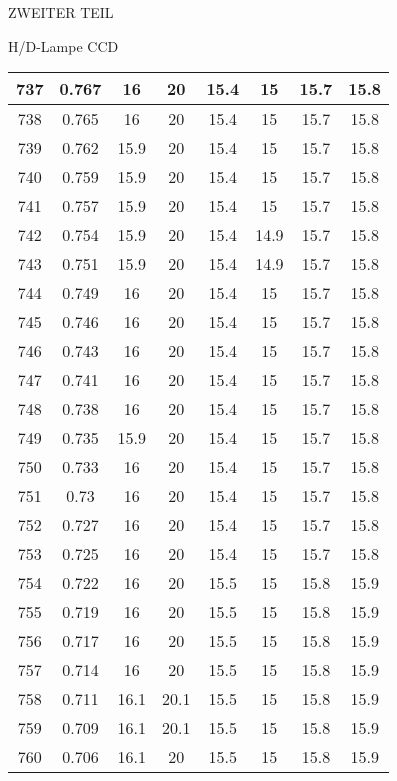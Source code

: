 \begin{appendix}
\begin{chapter}{ZWEITER TEIL}
\begin{section}{H/D-Lampe CCD}
\begin{scriptsize}
\begin{longtable}[htbp]{|c|c|c|c|c|c|c|c|}
            737 & 0.767 & 16 & 20 & 15.4 & 15 & 15.7 & 15.8 \\ \hline
            738 & 0.765 & 16 & 20 & 15.4 & 15 & 15.7 & 15.8 \\ \hline
            739 & 0.762 & 15.9 & 20 & 15.4 & 15 & 15.7 & 15.8 \\ \hline
            740 & 0.759 & 15.9 & 20 & 15.4 & 15 & 15.7 & 15.8 \\ \hline
            741 & 0.757 & 15.9 & 20 & 15.4 & 15 & 15.7 & 15.8 \\ \hline
            742 & 0.754 & 15.9 & 20 & 15.4 & 14.9 & 15.7 & 15.8 \\ \hline
            743 & 0.751 & 15.9 & 20 & 15.4 & 14.9 & 15.7 & 15.8 \\ \hline
            744 & 0.749 & 16 & 20 & 15.4 & 15 & 15.7 & 15.8 \\ \hline
            745 & 0.746 & 16 & 20 & 15.4 & 15 & 15.7 & 15.8 \\ \hline
            746 & 0.743 & 16 & 20 & 15.4 & 15 & 15.7 & 15.8 \\ \hline
            747 & 0.741 & 16 & 20 & 15.4 & 15 & 15.7 & 15.8 \\ \hline
            748 & 0.738 & 16 & 20 & 15.4 & 15 & 15.7 & 15.8 \\ \hline
            749 & 0.735 & 15.9 & 20 & 15.4 & 15 & 15.7 & 15.8 \\ \hline
            750 & 0.733 & 16 & 20 & 15.4 & 15 & 15.7 & 15.8 \\ \hline
            751 & 0.73 & 16 & 20 & 15.4 & 15 & 15.7 & 15.8 \\ \hline
            752 & 0.727 & 16 & 20 & 15.4 & 15 & 15.7 & 15.8 \\ \hline
            753 & 0.725 & 16 & 20 & 15.4 & 15 & 15.7 & 15.8 \\ \hline
            754 & 0.722 & 16 & 20 & 15.5 & 15 & 15.8 & 15.9 \\ \hline
            755 & 0.719 & 16 & 20 & 15.5 & 15 & 15.8 & 15.9 \\ \hline
            756 & 0.717 & 16 & 20 & 15.5 & 15 & 15.8 & 15.9 \\ \hline
            757 & 0.714 & 16 & 20 & 15.5 & 15 & 15.8 & 15.9 \\ \hline
            758 & 0.711 & 16.1 & 20.1 & 15.5 & 15 & 15.8 & 15.9 \\ \hline
            759 & 0.709 & 16.1 & 20.1 & 15.5 & 15 & 15.8 & 15.9 \\ \hline
            760 & 0.706 & 16.1 & 20 & 15.5 & 15 & 15.8 & 15.9 \\ \hline

\end{longtable}
\end{scriptsize}
\end{section}
\end{chapter}
\end{appendix}
